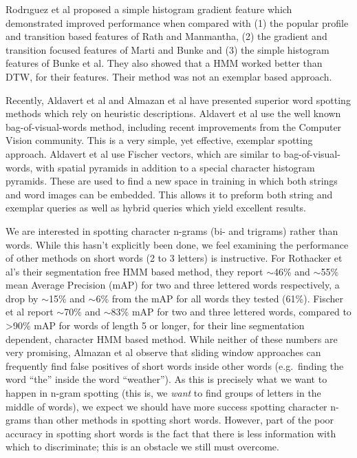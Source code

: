 \documentclass[ms]{byuprop}
\begin{document}
Rodr{\i}guez et al\cite{Rodrıguez2008} proposed a simple histogram gradient feature which demonstrated improved performance when compared with (1) the popular profile and transition based features of Rath and Manmantha\cite{Rath2003}, (2) the gradient and transition focused features of Marti and Bunke\cite{Marti2001} and (3) the simple histogram features of Bunke et al\cite{Bunke2004}. They also showed that a HMM worked better than DTW, for their features. Their method was not an exemplar based approach.

Recently, Aldavert et al\cite{Aldavert2015} and Almazan et al\cite{Almazan2014} have presented superior word spotting methods which rely on heuristic descriptions. Aldavert et al use the well known bag-of-visual-words method, including recent improvements from the Computer Vision community. This is a very simple, yet effective, exemplar spotting approach. Aldavert et al use Fischer vectors, which are similar to bag-of-visual-words, with spatial pyramids in addition to a special character histogram pyramids. These are used to find a new space in training in which both strings and word images can be embedded. This allows it to preform both string and exemplar queries as well as hybrid queries which yield excellent results.

We are interested in spotting character n-grams (bi- and trigrams) rather than words. While this hasn't explicitly been done, we feel examining the performance of other methods on short words (2 to 3 letters) is instructive. For Rothacker et al's\cite{Rothacker2013} their segmentation free HMM based method, they report $\sim$46\% and $\sim$55\% mean Average Precision (mAP) for two and three lettered words respectively, a drop by $\sim$15\% and $\sim$6\% from the mAP for all words they tested (61\%). Fischer et al\cite{Fischer2012} report $\sim$70\% and $\sim$83\% mAP for two and three lettered words, compared to {\textgreater}90\% mAP for words of length 5 or longer, for their line segmentation dependent, character HMM based method. While neither of these numbers are very promising, Almazan et al\cite{Almazan2012} observe that sliding window approaches can frequently find false positives of short words inside other words (e.g.~finding the word ``the'' inside the word ``weather''). As this is precisely what we want to happen in n-gram spotting (this is, we \textit{want} to find groups of letters in the middle of words), we expect we should have more success spotting character n-grams than other methods in spotting short words. However, part of the poor accuracy in spotting short words is the fact that there is less information with which to discriminate; this is an obstacle we still must overcome.
\end{document}
